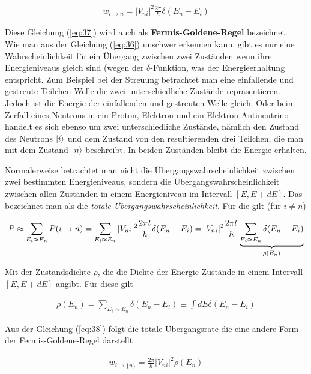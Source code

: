 \begin{align}
  \label{eq:37}
\boxed{  w_{i\to n}= |V_{ni}|^2 \frac{2\pi}{\hbar} \delta(E_n-E_i) }
\end{align}

Diese Gleichung (\ref{eq:37}) wird auch als \textbf{Fermis-Goldene-Regel} bezeichnet.
\\
Wie man aus der Gleichung (\ref{eq:36}) unschwer erkennen kann, gibt es nur eine Wahrscheinlichkeit für ein Übergang zwischen zwei Zuständen wenn ihre Energieniveaus gleich sind (wegen der \(\delta\)-Funktion, was der Energieerhaltung entspricht. Zum Beispiel bei der Streuung betrachtet man eine einfallende und gestreute Teilchen-Welle die zwei unterschiedliche Zustände repräsentieren. Jedoch ist die Energie der einfallenden und gestreuten Welle gleich. Oder beim Zerfall eines Neutrons in ein Proton, Elektron und ein Elektron-Antineutrino handelt es sich ebenso um zwei unterschiedliche Zustände, nämlich den Zustand des Neutrons \(\left| i \right\rangle\) und dem Zustand von den resultierenden drei Teilchen, die man mit dem Zustand \(\left| n \right\rangle\) beschreibt. In beiden Zuständen bleibt die Energie erhalten.

Normalerweise betrachtet man nicht die Übergangswahrscheinlichkeit zwischen zwei bestimmten Energieniveaus, sondern die Übergangswahrscheinlichkeit zwischen allen Zuständen in einem Energieniveau im Intervall \([E,E+dE]\). Das bezeichnet man als die \textit{totale Übergangswahrscheinlichkeit}. Für die gilt (für \(i\ne n\))

\begin{align}
  \label{eq:38}
  P\approx \sum_{E_i\approx E_n} P(i\rightarrow n) = \sum_{E_i\approx E_n} |V_{ni}|^2 \frac{2\pi t}{\hbar} \delta(E_n-E_i) =  |V_{ni}|^2 \frac{2\pi t}{\hbar} \underbr{ \sum_{E_i\approx E_n}\delta(E_n-E_i)}_{\rho(E_n) }
\end{align}

Mit der Zustandsdichte \(\rho\), die die Dichte der Energie-Zustände in einem Intervall \([E,E+dE]\) angibt. Für diese gilt

\begin{align}
  \label{eq:39}
  \rho(E_n) = \sum_{E_i\approx E_n}\delta(E_n-E_i) \equiv \int dE \delta(E_n-E_i)
\end{align}

Aus der Gleichung (\ref{eq:38}) folgt die totale Übergangsrate die eine andere Form der Fermis-Goldene-Regel darstellt

\begin{align}
  \label{eq:40}
  \boxed{  w_{i\to \{n\}}= \frac{2\pi }{\hbar} |V_{ni}|^2  \rho(E_n) }
\end{align}

